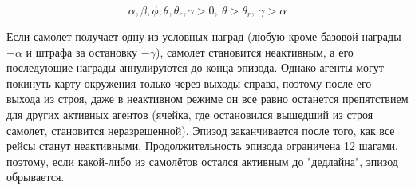\begin{equation}
    \alpha, \beta, \phi, \theta, \theta_r, \gamma > 0,\ \theta > \theta_r,\ \gamma > \alpha
\end{equation}

Если самолет получает одну из условных наград (любую кроме базовой награды $-\alpha$ и штрафа за остановку $-\gamma$),
 самолет становится неактивным, а его последующие награды аннулируются до конца эпизода.
Однако агенты могут покинуть карту окружения только через выходы справа, 
поэтому после его выхода из строя, даже в неактивном режиме он все равно останется препятствием для 
других активных агентов (ячейка, где остановился вышедший из строя самолет, становится неразрешенной).
Эпизод заканчивается после того, как все рейсы станут неактивными.
Продолжительность эпизода ограничена 12 шагами,
поэтому, если какой-либо из самолётов остался активным до "дедлайна", эпизод обрывается.